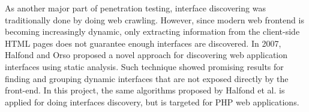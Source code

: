 As another major part of penetration testing, interface discovering was traditionally done by doing web crawling. However, since modern web frontend is becoming increasingly dynamic, only extracting information from the client-side HTML pages does not guarantee enough interfaces are discovered. In 2007, Halfond and Orso \cite{ref3} proposed a novel approach for discovering web application interfaces using static analysis. Such technique showed promising results for finding and grouping dynamic interfaces that are not exposed directly by the front-end.
In this project, the same algorithms proposed by Halfond et al. is applied for doing interfaces discovery, but is targeted for PHP web applications.



